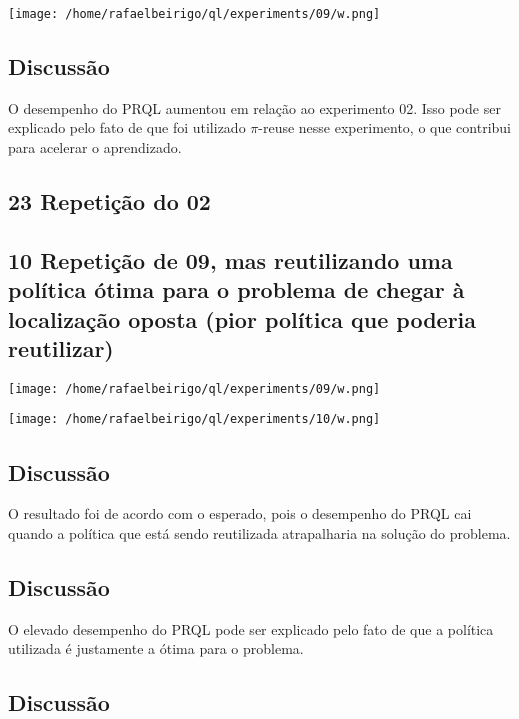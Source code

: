 \documentclass[11pt]{article}
\begin{document}
\centerline{\texttt{[image: /home/rafaelbeirigo/ql/experiments/09/w.png]}}


\subsection{Discussão}
\label{sec-3.9}

O desempenho do PRQL aumentou em relação ao experimento 02. Isso pode
ser explicado pelo fato de que foi utilizado $\pi$-reuse nesse
experimento, o que contribui para acelerar o aprendizado.


\subsection{23 Repetição do 02}
\label{sec-3.10}



\subsection{10 Repetição de 09, mas reutilizando uma política ótima para o problema de chegar à localização oposta (pior política que poderia reutilizar)}
\label{sec-3.11}

\centerline{\texttt{[image: /home/rafaelbeirigo/ql/experiments/09/w.png]}}


\centerline{\texttt{[image: /home/rafaelbeirigo/ql/experiments/10/w.png]}}


\subsection{Discussão}
\label{sec-3.12}

O resultado foi de acordo com o esperado, pois o desempenho do PRQL
cai quando a política que está sendo reutilizada atrapalharia na
solução do problema.

\subsection{Discussão}
\label{sec-3.13}

O elevado desempenho do PRQL pode ser explicado pelo fato de que a
política utilizada é justamente a ótima para o problema.

\subsection{Discussão}
\label{sec-3.14}
\end{document}
